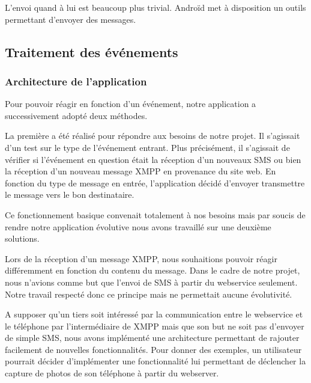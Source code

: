 L'envoi quand à lui est beaucoup plus trivial. Androïd met à disposition un outils permettant d'envoyer
des messages.
\\



\subsection{Traitement des événements}

\subsubsection{Architecture de l'application}

Pour pouvoir réagir en fonction d'un événement, notre application a successivement adopté deux méthodes.

La première a été réalisé pour répondre aux besoins de notre projet. Il s'agissait d'un test sur le 
type de l’événement entrant. Plus précisément, il s'agissait de vérifier si l’événement en question 
était la réception d'un nouveaux SMS ou bien la réception d'un nouveau message XMPP en provenance du 
site web. En fonction du type de message en entrée, l'application décidé d'envoyer transmettre le message
vers le bon destinataire. 

Ce fonctionnement basique convenait totalement à nos besoins mais par soucis de rendre notre application
évolutive nous avons travaillé sur une deuxième solutions.

Lors de la réception d'un message XMPP, nous souhaitions pouvoir réagir différemment en fonction du contenu
du message. Dans le cadre de notre projet, nous n'avions comme but que l'envoi de SMS à partir du webservice
seulement. Notre travail respecté donc ce principe mais ne permettait aucune évolutivité.

A supposer qu'un tiers soit intéressé par la communication entre le webservice et le téléphone par 
l'intermédiaire de XMPP mais que son but ne soit pas d'envoyer de simple SMS, nous avons implémenté une
architecture permettant de rajouter facilement de nouvelles fonctionnalités. Pour donner des exemples, 
un utilisateur pourrait décider d'implémenter une fonctionnalité lui permettant de déclencher la capture
de photos de son téléphone à partir du webserver.

